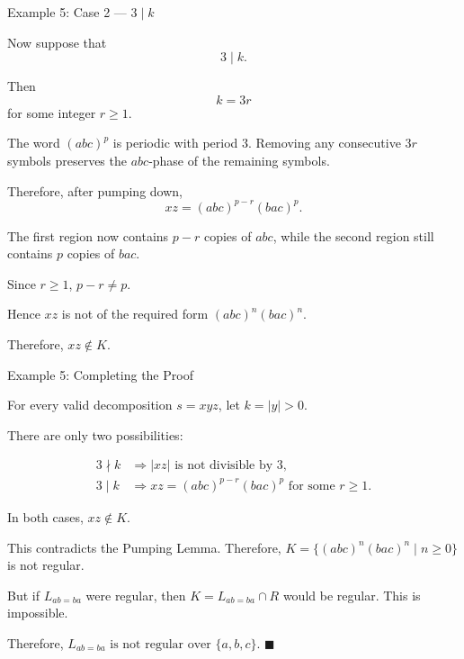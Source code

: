 \documentclass[10pt,aspectratio=169]{beamer}
\begin{document}
\begin{frame}{Example 5: Case 2 --- \(3\mid k\)}

\small
Now suppose that
\[
3\mid k.
\]

Then
\[
k=3r
\]
for some integer \(r\geq 1\).

The word \((abc)^p\) is periodic with period \(3\). Removing any
consecutive \(3r\) symbols preserves the \(abc\)-phase of the
remaining symbols.

Therefore, after pumping down,
\[
xz=(abc)^{p-r}(bac)^p.
\]

The first region now contains \(p-r\) copies of \(abc\), while the
second region still contains \(p\) copies of \(bac\).

Since \(r\geq 1\),
\(
p-r\neq p.
\)

Hence \(xz\) is not of the required form
\(
(abc)^n(bac)^n.
\)

Therefore,
\(
xz\notin K.
\)

\end{frame}

\begin{frame}{Example 5: Completing the Proof}

\small
For every valid decomposition \(s=xyz\), let \(k=|y|>0\).

There are only two possibilities:

\[
\begin{array}{ll}
3\nmid k
&
\Longrightarrow
|xz|\text{ is not divisible by }3,
\\[0.5em]
3\mid k
&
\Longrightarrow
xz=(abc)^{p-r}(bac)^p
\text{ for some }r\geq 1.
\end{array}
\]

In both cases,
\(
xz\notin K.
\)

This contradicts the Pumping Lemma. Therefore,
\(
K=\{(abc)^n(bac)^n\mid n\geq 0\}
\)
is not regular.

But if \(L_{ab=ba}\) were regular, then
\(
K=L_{ab=ba}\cap R
\)
would be regular. This is impossible.

Therefore,
\(
\boxed{L_{ab=ba}\text{ is not regular over }\{a,b,c\}.}
\)
\hfill\(\blacksquare\)

\end{frame}
\end{document}
